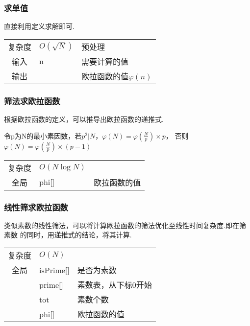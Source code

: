         \subsubsection{求单值}\small
直接利用定义求解即可.

\begin{longtable}{|c|l|l|}
复杂度 & $O(\sqrt{N})$& 预处理 \\
输入 & n & 需要计算的值 \\
输出 & & 欧拉函数的值$\varphi (n)$ \\
\end{longtable}



        \subsubsection{筛法求欧拉函数}\small
根据欧拉函数的定义，可以推导出欧拉函数的递推式.

令p为N的最小素因数，若$p^2|N$，$\varphi (N) = \varphi(\frac{N}{p}) \times p$，
否则$\varphi (N) = \varphi(\frac{N}{p}) \times (p-1)$

\begin{longtable}{|c|l|l|}
复杂度 & $O(N\log N)$ &  \\
全局 & phi[] & 欧拉函数的值 \\ 
\end{longtable}



        \subsubsection{线性筛求欧拉函数}\small
类似素数的线性筛法，可以将计算欧拉函数的筛法优化至线性时间复杂度.即在筛素数
的同时，用递推式的结论，将其计算.

\begin{longtable}{|c|l|l|}
复杂度 & $O(N)$ &  \\
全局 & isPrime[] & 是否为素数 \\
 & prime[] & 素数表，从下标0开始 \\
 & tot & 素数个数 \\
 & phi[] & 欧拉函数的值 \\ 
\end{longtable}




